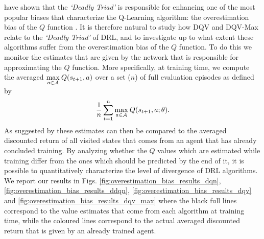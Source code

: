 \citet{van2018deep_triad} have shown that the \textit{`Deadly Triad'} is responsible for enhancing one of the most popular biases that characterize the Q-Learning algorithm: the overestimation bias of the $Q$ function \cite{hasselt2010double}. It is therefore natural to study how DQV and DQV-Max relate to the \textit{`Deadly Triad'} of DRL, and to investigate up to what extent these algorithms suffer from the overestimation bias of the $Q$ function. To do this we monitor the estimates that are given by the network that is responsible for approximating the $Q$ function. More specifically, at training time, we compute the averaged $\underset{a \in \cal A}{\max}\:Q(s_{t+1}, a)$ over a set ($n$) of full evaluation episodes as defined by 
\begin{equation}
\frac{1}{n}\sum_{t=1}^{n}\underset{a \in \cal A}{\max}\:Q(s_{t+1}, a;\theta).
\end{equation}
As suggested by \citet{van2016deep} these estimates can then be compared to the averaged discounted return of all visited states that comes from an agent that has already concluded training. By analyzing whether the $Q$ values which are estimated while training differ from the ones which should be predicted by the end of it, it is possible to quantitatively characterize the level of divergence of DRL algorithms. We report our results in Figs. \ref{fig:overestimation_bias_results_dqn}, \ref{fig:overestimation_bias_results_ddqn}, \ref{fig:overestimation_bias_results_dqv} and \ref{fig:overestimation_bias_results_dqv_max} where the black full lines correspond to the value estimates that come from each algorithm at training time, while the coloured lines correspond to the actual averaged discounted return that is given by an already trained agent.


